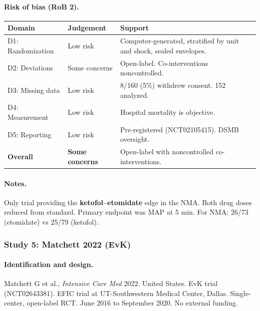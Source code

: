 \documentclass[11pt]{article}
\begin{document}
\paragraph{Risk of bias (RoB 2).}

\begin{table}[H]
\centering\footnotesize
\begin{tabularx}{\textwidth}{L{3cm} C{2cm} X}
\toprule
\textbf{Domain} & \textbf{Judgement} & \textbf{Support} \\
\midrule
D1: Randomization & Low risk & Computer-generated, stratified by unit and shock, sealed envelopes. \\
D2: Deviations & Some concerns & Open-label. Co-interventions noncontrolled. \\
D3: Missing data & Low risk & 8/160 (5\%) withdrew consent. 152 analyzed. \\
D4: Measurement & Low risk & Hospital mortality is objective. \\
D5: Reporting & Low risk & Pre-registered (NCT02105415). DSMB oversight. \\
\textbf{Overall} & \textbf{Some concerns} & Open-label with noncontrolled co-interventions. \\
\bottomrule
\end{tabularx}
\end{table}

\paragraph{Notes.}
Only trial providing the \textbf{ketofol--etomidate} edge in the NMA. Both drug doses reduced from standard. Primary endpoint was MAP at 5 min. For NMA: 26/73 (etomidate) vs 25/79 (ketofol).

\bigskip

\subsubsection{Study 5: Matchett 2022 (EvK)}

\paragraph{Identification and design.}
Matchett G et al., \textit{Intensive Care Med} 2022. United States. EvK trial (NCT02643381). EFIC trial at UT-Southwestern Medical Center, Dallas. Single-center, open-label RCT. June 2016 to September 2020. No external funding.
\end{document}
